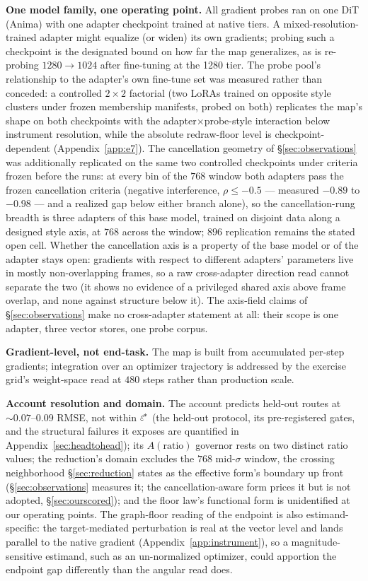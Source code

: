 \textbf{One model family, one operating point.} All gradient probes ran
on one DiT (Anima) with one adapter checkpoint trained at native tiers.
A mixed-resolution-trained adapter might equalize (or widen) its own
gradients; probing such a checkpoint is the designated bound on how far
the map generalizes, as is re-probing $1280{\to}1024$ after fine-tuning
at the 1280 tier. The probe pool's relationship to the adapter's own
fine-tune set was measured rather than conceded: a controlled
$2{\times}2$ factorial (two LoRAs trained on opposite style clusters
under frozen membership manifests, probed on both) replicates the map's
shape on both checkpoints with the adapter$\times$probe-style
interaction below instrument resolution, while the absolute
redraw-floor level is checkpoint-dependent (Appendix~\ref{app:e7}).
The cancellation geometry of \S\ref{sec:observations} was
additionally replicated on the same two controlled checkpoints under
criteria frozen before the runs: at every bin of the $768$ window
both adapters pass the frozen cancellation criteria (negative
interference, $\rho \le -0.5$ --- measured $-0.89$ to $-0.98$ ---
and a realized gap below either branch alone), so the
cancellation-rung breadth is three adapters of this base model,
trained on disjoint data along a designed style axis, at $768$
across the window; $896$ replication remains the stated open cell.
Whether the cancellation axis is a property of the base model or of
the adapter stays open: gradients with respect to different
adapters' parameters live in mostly non-overlapping frames, so a raw
cross-adapter direction read cannot separate the two (it shows no
evidence of a privileged shared axis above frame overlap, and none
against structure below it). The axis-field claims of
\S\ref{sec:observations} make no cross-adapter statement at all:
their scope is one adapter, three vector stores, one probe corpus.

\textbf{Gradient-level, not end-task.} The map is built from
accumulated per-step gradients; integration over an optimizer
trajectory is addressed by the exercise grid's weight-space read at
$480$ steps rather than production scale.

\textbf{Account resolution and domain.} The account predicts held-out
routes at ${\sim}0.07$--$0.09$ RMSE, not within $\varepsilon^{\!*}$ (the
held-out protocol, its pre-registered gates, and the structural
failures it exposes are quantified in Appendix~\ref{sec:headtohead});
its
$A(\mathrm{ratio})$ governor rests on two distinct ratio values; the
reduction's domain excludes the $768$ mid-$\sigma$ window, the
crossing neighborhood \S\ref{sec:reduction} states as the effective
form's boundary up front (\S\ref{sec:observations} measures it; the
cancellation-aware form prices it but is not adopted,
\S\ref{sec:ourscored}); and
the floor law's functional form is unidentified at our operating
points. The graph-floor reading of the endpoint is
also estimand-specific: the target-mediated perturbation is real at the
vector level and lands parallel to the native gradient
(Appendix~\ref{app:instrument}), so a magnitude-sensitive estimand,
such as an un-normalized optimizer, could apportion the endpoint gap
differently than the angular read does.

